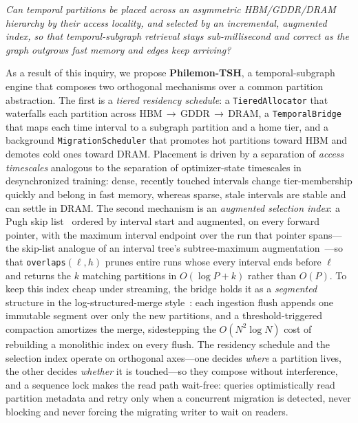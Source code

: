 \documentclass[10pt]{article}
\theoremstyle{definition}
\begin{document}
\begin{center}
\emph{Can temporal partitions be placed across an asymmetric HBM/GDDR/DRAM
hierarchy by their access locality, and selected by an incremental, augmented
index, so that temporal-subgraph retrieval stays sub-millisecond and correct as
the graph outgrows fast memory and edges keep arriving?}
\end{center}

As a result of this inquiry, we propose \textbf{Philemon-TSH}, a temporal-subgraph
engine that composes two orthogonal mechanisms over a common partition abstraction.
The first is a \emph{tiered residency schedule}: a \texttt{TieredAllocator} that
waterfalls each partition across HBM\,$\rightarrow$\,GDDR\,$\rightarrow$\,DRAM, a
\texttt{TemporalBridge} that maps each time interval to a subgraph partition and a
home tier, and a background \texttt{MigrationScheduler} that promotes hot
partitions toward HBM and demotes cold ones toward DRAM. Placement is driven by a
separation of \emph{access timescales} analogous to the separation of optimizer-state
timescales in desynchronized training: dense, recently touched intervals change
tier-membership quickly and belong in fast memory, whereas sparse, stale intervals
are stable and can settle in DRAM. The second mechanism is an \emph{augmented
selection index}: a Pugh skip list~\citep{pugh1990skiplists} ordered by interval
start and augmented, on every forward pointer, with the maximum interval endpoint
over the run that pointer spans---the skip-list analogue of an interval tree's
subtree-maximum augmentation~\citep[\S14.3]{clrs2009}---so that
\texttt{overlaps}$(\ell,h)$ prunes entire runs whose every interval ends before
$\ell$ and returns the $k$ matching partitions in $O(\log P + k)$ rather than
$O(P)$. To keep this index cheap under streaming, the bridge holds it as a
\emph{segmented} structure in the log-structured-merge style~\citep{oneil1996lsm}:
each ingestion flush appends one immutable segment over only the new partitions,
and a threshold-triggered compaction amortizes the merge, sidestepping the
$O(N^2\log N)$ cost of rebuilding a monolithic index on every flush. The residency
schedule and the selection index operate on orthogonal axes---one decides
\emph{where} a partition lives, the other decides \emph{whether} it is touched---so
they compose without interference, and a sequence
lock makes the read path wait-free: queries optimistically read partition metadata
and retry only when a concurrent migration is detected, never blocking and never
forcing the migrating writer to wait on readers.
\end{document}
